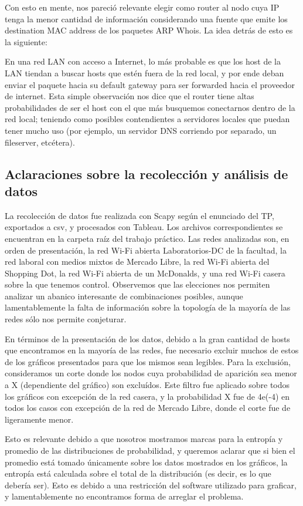 \documentclass{article}
\theoremstyle{definition}
\theoremstyle{remark}
\begin{document}
Con esto en mente, nos pareció relevante elegir como router al nodo cuya IP tenga la menor cantidad de información considerando una fuente que emite los destination MAC address de los paquetes ARP Whois. La idea detrás de esto es la siguiente:

En una red LAN con acceso a Internet, lo más probable es que los host de la LAN tiendan a buscar hosts que estén fuera de la red local, y por ende deban enviar el paquete hacia su default gateway para ser forwarded hacia el proveedor de internet. Esta simple observación nos dice que el router tiene altas probabilidades de ser el host con el que más busquemos conectarnos dentro de la red local; teniendo como posibles contendientes a servidores locales que puedan tener mucho uso (por ejemplo, un servidor DNS corriendo por separado, un fileserver, etcétera). 

\subsection{Aclaraciones sobre la recolección y análisis de datos}

La recolección de datos fue realizada con Scapy según el enunciado del TP, exportados a csv, y procesados con Tableau. Los archivos correspondientes se encuentran en la carpeta raíz del trabajo práctico. Las redes analizadas son, en orden de presentación, la red Wi-Fi abierta Laboratorios-DC de la facultad, la red laboral con medios mixtos de Mercado Libre, la red Wi-Fi abierta del Shopping Dot, la red Wi-Fi abierta de un McDonalds, y una red Wi-Fi casera sobre la que tenemos control. Observemos que las elecciones nos permiten analizar un abanico interesante de combinaciones posibles, aunque lamentablemente la falta de información sobre la topología de la mayoría de las redes sólo nos permite conjeturar.

En términos de la presentación de los datos, debido a la gran cantidad de hosts que encontramos en la mayoría de las redes, fue necesario excluir muchos de estos de los gráficos presentados para que los mismos sean legibles. Para la exclusión, consideramos un corte donde los nodos cuya probabilidad de aparición sea menor a X (dependiente del gráfico) son excluídos. Este filtro fue aplicado sobre todos los gráficos con excepción de la red casera, y la probabilidad X fue de 4e(-4) en todos los casos con excepción de la red de Mercado Libre, donde el corte fue de ligeramente menor.

Esto es relevante debido a que nosotros mostramos marcas para la entropía y promedio de las distribuciones de probabilidad, y queremos aclarar que si bien el promedio está tomado únicamente sobre los datos mostrados en los gráficos, la entropía está calculada sobre el total de la distribución (es decir, es lo que debería ser). Esto es debido a una restricción del software utilizado para graficar, y lamentablemente no encontramos forma de arreglar el problema.
\end{document}
